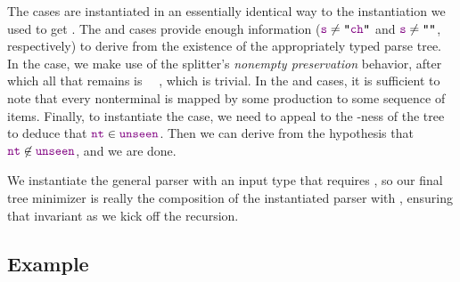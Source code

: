     The  cases are instantiated in an essentially identical way to the instantiation we used to get .  The  and  cases provide enough information ($\farg{s}\neq\str{\farg{ch}}$ and $\farg{s}\neq\str{}$, respectively) to derive \False{} from the existence of the appropriately typed parse tree.  In the  case, we make use of the splitter's \emph{nonempty preservation} behavior, after which all that remains is \typesum{\False}{\False}~\typeto~\False, which is trivial.  In the  and  cases, it is sufficient to note that every nonterminal is mapped by some production to some sequence of items.  Finally, to instantiate the  case, we need to appeal to the -ness of the tree to deduce that $\textcolor{violet}{\texttt{nt}}\in \textcolor{violet}{\texttt{unseen}}$.  Then we can derive \False{} from the hypothesis that $\textcolor{violet}{\texttt{nt}}\not\in\textcolor{violet}{\texttt{unseen}}$, and we are done.

    We instantiate the general parser with an input type that requires , so our final tree minimizer is really the composition of the instantiated parser with , ensuring that invariant as we kick off the recursion.

  \subsection{Example} \label{sec:example-min-execution}

